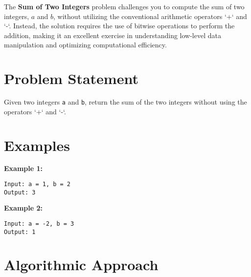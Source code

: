 
\label{problem:sum_of_two_integers}
    
The \textbf{Sum of Two Integers} problem challenges you to compute the sum of two integers, \(a\) and \(b\), without utilizing the conventional arithmetic operators `+` and `-`. Instead, the solution requires the use of bitwise operations to perform the addition, making it an excellent exercise in understanding low-level data manipulation and optimizing computational efficiency.

\section*{Problem Statement}

Given two integers \texttt{a} and \texttt{b}, return the sum of the two integers without using the operators `+` and `-`.

\section*{Examples}

\textbf{Example 1:}

\begin{verbatim}
Input: a = 1, b = 2
Output: 3
\end{verbatim}

\textbf{Example 2:}

\begin{verbatim}
Input: a = -2, b = 3
Output: 1
\end{verbatim}



\section*{Algorithmic Approach}

